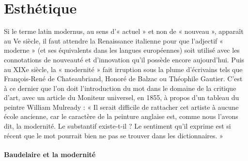 \section{Esthétique}


Si le terme latin modernus, au sens d'« actuel » et non de « nouveau », apparaît au Ve siècle, il faut attendre la Renaissance italienne pour que l'adjectif « moderne » (et ses équivalents dans les langues européennes) soit utilisé avec les connotations de nouveauté et d'innovation qu'il possède encore aujourd'hui. Puis au XIXe siècle, la « modernité » fait irruption sous la plume d'écrivains tels que François-René de Chateaubriand, Honoré de Balzac ou Théophile Gautier.
C'est à ce dernier que l'on doit l'introduction du mot dans le domaine de la critique d'art, avec un article du Moniteur universel, en 1855, à propos d'un tableau du peintre William Mulready : « Il serait difficile de rattacher cet artiste à aucune école ancienne, car le caractère de la peinture anglaise est, comme nous l'avons dit, la modernité. Le substantif existe-t-il ?
Le sentiment qu'il exprime est si récent que le mot pourrait bien ne pas se trouver dans les dictionnaires. »

\paragraph{Baudelaire et la modernité}



